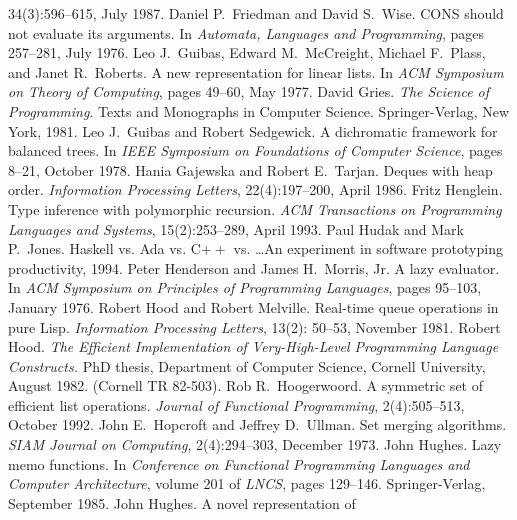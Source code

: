 \begin{thebibliography}{XXXXXXX}
  34(3):596--615, July 1987.
 Daniel P.~Friedman and David
  S.~Wise. CONS should not evaluate its arguments. In
  \textit{Automata, Languages and Programming}, pages 257--281, July 1976.
 Leo J.~Guibas, Edward M.~McCreight,
  Michael F.~Plass, and Janet R.~Roberts. A new representation for
  linear lists. In \textit{ACM Symposium on Theory of Computing},
  pages 49--60, May 1977.
 David Gries. \textit{The Science of
    Programming}. Texts and Monographs in Computer
  Science. Springer-Verlag, New York, 1981.
 Leo J.~Guibas and Robert
  Sedgewick. A dichromatic framework for balanced trees. In
  \textit{IEEE Symposium on Foundations of Computer Science}, pages
  8--21, October 1978.
 Hania Gajewska and Robert
  E.~Tarjan. Deques with heap order. \textit{Information Processing
    Letters}, 22(4):197--200, April 1986.
 Fritz Henglein. Type inference with
  polymorphic recursion. \textit{ACM Transactions on Programming
    Languages and Systems}, 15(2):253--289, April 1993.
 Paul Hudak and Mark P.~Jones. Haskell
  vs. Ada vs. C$++$ vs. \ldots An experiment in software prototyping
  productivity, 1994.
 Peter Henderson and James
  H.~Morris, Jr. A lazy evaluator. In \textit{ACM Symposium on
    Principles of Programming Languages}, pages 95--103, January 1976.
 Robert Hood and Robert
  Melville. Real-time queue operations in pure
  Lisp. \textit{Information Processing Letters}, 13(2): 50--53,
  November 1981.
 Robert Hood. \textit{The Efficient
    Implementation of Very-High-Level Programming Language
    Constructs.}\/ PhD thesis, Department of Computer Science, Cornell
  University, August 1982. (Cornell TR 82-503).
 Rob R.~Hoogerwoord. A symmetric set
  of efficient list operations. \textit{Journal of Functional
    Programming}, 2(4):505--513, October 1992.
 John E.~Hopcroft and Jeffrey
  D.~Ullman. Set merging algorithms. \textit{SIAM Journal on
    Computing}, 2(4):294--303, December 1973.
 John Hughes. Lazy memo functions. In
  \textit{Conference on Functional Programming Languages and Computer
    Architecture}, volume 201 of \textit{LNCS}, pages
  129--146. Springer-Verlag, September 1985.
 John Hughes. A novel representation of

\end{thebibliography}

